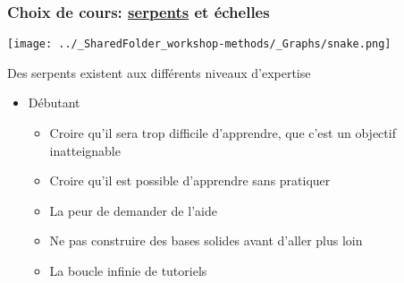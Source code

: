 \documentclass{beamer}
\begin{document}

  \begin{frame}
    
      \frametitle{Choix de cours: \uline{serpents} et échelles} \vspace{1cm}
      
        \begin{center}
        
          \texttt{[image: ../\_SharedFolder\_workshop-methods/\_Graphs/snake.png]}
         
        \end{center} 
        
  Des serpents existent aux différents niveaux d'expertise
      
    \begin{itemize}
       
      \item{Débutant}
        
          \begin{itemize}
            \item Croire qu'il sera trop difficile d'apprendre, que c'est un objectif inatteignable
            \item Croire qu'il est possible d'apprendre sans pratiquer
            \item La peur de demander de l'aide
            \item Ne pas construire des bases solides avant d'aller plus loin
            \item La boucle infinie de tutoriels

          \end{itemize}
        
        \end{itemize}
        
     \end{frame}
  
\end{document}
